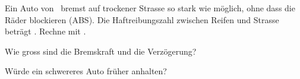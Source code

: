 Ein Auto von \mO\ bremst auf trockener Strasse so stark wie möglich, ohne dass die Räder blockieren (ABS). Die Haftreibungszahl zwischen Reifen und Strasse beträgt \muHO. Rechne mit \gO.

\begin{abcliste}
\abc
Wie gross sind die Bremskraft und die Verzögerung?

\abc
Würde ein schwereres Auto früher anhalten?
\end{abcliste}
